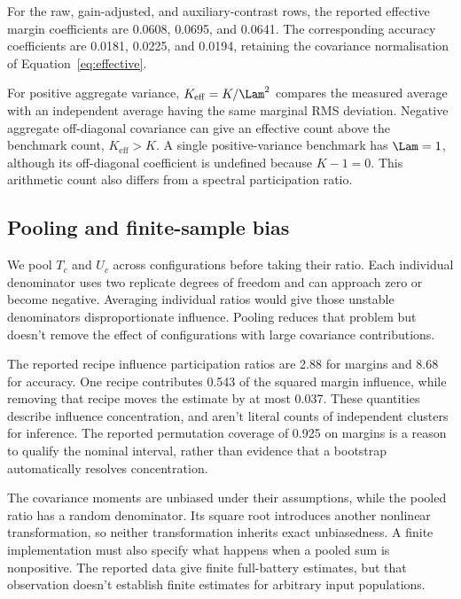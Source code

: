 For the raw, gain-adjusted, and auxiliary-contrast rows, the reported effective margin coefficients are 0.0608, 0.0695, and 0.0641. The corresponding accuracy coefficients are 0.0181, 0.0225, and 0.0194, retaining the covariance normalisation of Equation~\ref{eq:effective}.

For positive aggregate variance, $K_{\mathrm{eff}}=K/\Lam^2$ compares the measured average with an independent average having the same marginal RMS deviation. Negative aggregate off-diagonal covariance can give an effective count above the benchmark count, $K_{\mathrm{eff}}>K$. A single positive-variance benchmark has $\Lam=1$, although its off-diagonal coefficient is undefined because $K-1=0$. This arithmetic count also differs from a spectral participation ratio.

\subsection{Pooling and finite-sample bias}
We pool $T_c$ and $U_c$ across configurations before taking their ratio. Each individual denominator uses two replicate degrees of freedom and can approach zero or become negative. Averaging individual ratios would give those unstable denominators disproportionate influence. Pooling reduces that problem but doesn't remove the effect of configurations with large covariance contributions.

The reported recipe influence participation ratios are 2.88 for margins and 8.68 for accuracy. One recipe contributes 0.543 of the squared margin influence, while removing that recipe moves the estimate by at most 0.037. These quantities describe influence concentration, and aren't literal counts of independent clusters for inference. The reported permutation coverage of 0.925 on margins is a reason to qualify the nominal interval, rather than evidence that a bootstrap automatically resolves concentration.

The covariance moments are unbiased under their assumptions, while the pooled ratio has a random denominator. Its square root introduces another nonlinear transformation, so neither transformation inherits exact unbiasedness. A finite implementation must also specify what happens when a pooled sum is nonpositive. The reported data give finite full-battery estimates, but that observation doesn't establish finite estimates for arbitrary input populations.

